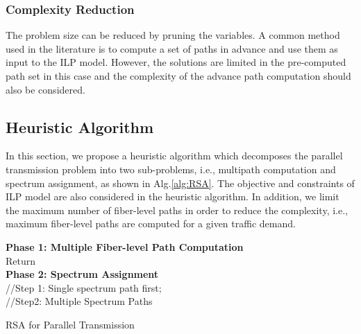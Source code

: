 \documentclass[conference]{IEEEtran}
\begin{document}
\subsubsection{Complexity Reduction}
The problem size can be reduced by pruning the variables.  A common method used in the literature is to compute a set of paths  in advance and use them as input to the ILP model.
However, the solutions are limited in the pre-computed path set in this case and the  complexity of the advance path computation should also be considered. 


 
\subsection{Heuristic Algorithm} 
 In this section, we propose a heuristic algorithm which decomposes the parallel transmission problem into two sub-problems, i.e.,  multipath computation and spectrum assignment,  as shown in Alg.\ref{alg:RSA}.
 The objective and constraints of  ILP model are also considered in the   heuristic algorithm.  In addition, we limit the maximum number of fiber-level paths in order to reduce the complexity, i.e., maximum  fiber-level paths are computed for a given traffic demand.  

\begin{algorithm}
\small
      \KwIn{, }
   \textbf{Phase 1: Multiple Fiber-level Path Computation}  \\
Return \\
 \textbf{Phase 2: Spectrum Assignment}  \\
//Step 1: Single spectrum path first;\\
//Step2: Multiple Spectrum Paths\\	  
  \caption{RSA for Parallel Transmission} 
 \label{alg:RSA}
\end{algorithm}  
\end{document}
